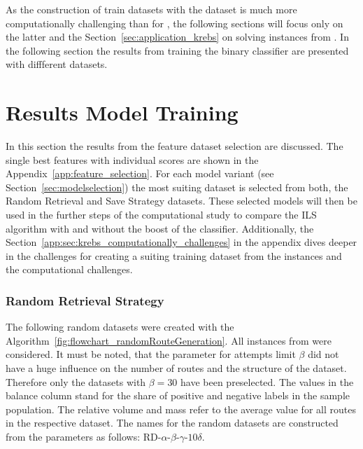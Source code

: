 \parbreak

As the construction of train datasets with the \krebsADataSetText dataset is much more computationally challenging than for \gendreauDataSet,
the following sections will focus only on the latter and the Section~\ref{sec:application_krebs} on solving instances from \krebsADataSet.
In the following section the results from training the binary classifier
are presented with diffferent datasets.

\section{Results Model Training}
\label{sec:ResultsTraining}
In this section the results from the feature dataset selection are discussed. The single best features
with individual scores are shown in the Appendix~\ref{app:feature_selection}. For each model variant (see Section~\ref{sec:modelselection})
the most suiting dataset is selected from both, the Random Retrieval and Save Strategy datasets. These selected
models will then be used in the further steps of the computational study to compare the \gls{ILS} algorithm
with and without the boost of the classifier. Additionally, the Section~\ref{app:sec:krebs_computationally_challenges} in the appendix
dives deeper in the challenges for creating a suiting training dataset from the \krebsADataSetText instances and the computational
challenges.

\subsubsection{Random Retrieval Strategy}
The following random datasets were created with the Algorithm~\ref{fig:flowchart_randomRouteGeneration}. All instances
from \gendreauDataSetText were considered. It must be noted, that the parameter for attempts limit $\beta$ did not have a huge influence on
the number of routes and the structure of the dataset. Therefore only the datasets with $\beta = 30$ have been preselected.
The values in the balance column stand for the share of positive and negative labels in the sample population. The relative volume
and mass refer to the average value for all routes in the respective dataset. The names for the random datasets are constructed from
the parameters as follows: RD-$\alpha$-$\beta$-$\gamma$-$10\delta$.

